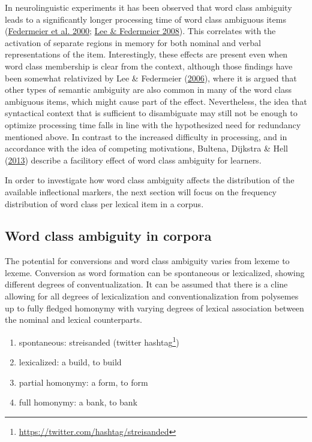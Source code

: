 \documentclass[
]{article}
\providecommand{\tightlist}{%
  \setlength{\itemsep}{0pt}\setlength{\parskip}{0pt}}
\begin{document}
In neurolinguistic experiments it has been observed that word class
ambiguity leads to a significantly longer processing time of word class
ambiguous items (\protect\hyperlink{ref-federmeier_et_al00}{Federmeier
et al. 2000}; \protect\hyperlink{ref-lee+federmeier08}{Lee \& Federmeier
2008}). This correlates with the activation of separate regions in
memory for both nominal and verbal representations of the item.
Interestingly, these effects are present even when word class membership
is clear from the context, although those findings have been somewhat
relativized by Lee \& Federmeier (\protect\hyperlink{ref-lee06}{2006}),
where it is argued that other types of semantic ambiguity are also
common in many of the word class ambiguous items, which might cause part
of the effect. Nevertheless, the idea that syntactical context that is
sufficient to disambiguate may still not be enough to optimize
processing time falls in line with the hypothesized need for redundancy
mentioned above. In contrast to the increased difficulty in processing,
and in accordance with the idea of competing motivations, Bultena,
Dijkstra \& Hell (\protect\hyperlink{ref-bultena_et_al13}{2013})
describe a facilitory effect of word class ambiguity for learners.

In order to investigate how word class ambiguity affects the
distribution of the available inflectional markers, the next section
will focus on the frequency distribution of word class per lexical item
in a corpus.

\hypertarget{conv_measure}{%
\subsection{Word class ambiguity in corpora}\label{conv_measure}}

The potential for conversions and word class ambiguity varies from
lexeme to lexeme. Conversion as word formation can be spontaneous or
lexicalized, showing different degrees of conventualization. It can be
assumed that there is a cline allowing for all degrees of lexicalization
and conventionalization from polysemes up to fully fledged homonymy with
varying degrees of lexical association between the nominal and lexical
counterparts.

\begin{enumerate}
\def\labelenumi{(\arabic{enumi})}
\tightlist
\item
  spontaneous: streisanded (twitter hashtag\footnote{\url{https://twitter.com/hashtag/streisanded}})
\item
  lexicalized: a build, to build
\item
  partial homonymy: a form, to form
\item
  full homonymy: a bank, to bank
\end{enumerate}
\end{document}
